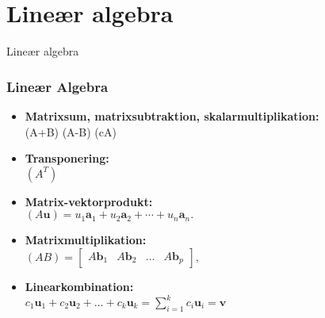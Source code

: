 \section{Lineær algebra}
\begin{frame}
\centering
\Huge
Lineær algebra
\end{frame}
%
\begin{frame}
\frametitle{Lineær Algebra}
\begin{itemize}
\item \textbf{Matrixsum, matrixsubtraktion, skalarmultiplikation: } \\ 
\phantom{11}(A+B)\phantom{11111111}  (A-B)\phantom{1111111111111}  (cA)
\item \textbf{Transponering: } \\ 
\phantom{111}$(A^T)$ 
\item \textbf{Matrix-vektorprodukt: } \\
$(A\textbf{u}) =u_1\textbf{a}_1 + u_2\textbf{a}_2 + \cdots + u_n\textbf{a}_n.$ \\
\item \textbf{Matrixmultiplikation: } \\
$(AB) =
\begin{bmatrix}
A\textbf{b}_1 & A\textbf{b}_2 & \ldots & A\textbf{b}_p
\end{bmatrix}\text{,}$
%
\item \textbf{Linearkombination: } \\
$c_1\mathbf{u}_1+c_2\mathbf{u}_2+\ldots+c_k\mathbf{u}_k=\sum\limits_{i=1}^k c_i\mathbf{u}_i=\mathbf{v}$
\end{itemize}
\end{frame}
